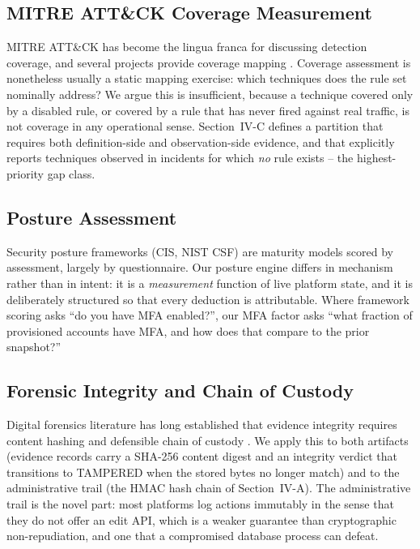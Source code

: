 \documentclass[conference]{IEEEtran}
\begin{document}
\subsection{MITRE ATT\&CK Coverage Measurement}

MITRE ATT\&CK \cite{mitre_attack} has become the lingua franca for
discussing detection coverage, and several projects provide coverage
mapping \cite{caldera, atomic}. Coverage assessment is nonetheless usually a
static mapping exercise: which techniques does the rule set nominally
address? We argue this is insufficient, because a technique covered only by a
disabled rule, or covered by a rule that has never fired against real
traffic, is not coverage in any operational sense. Section~IV-C defines a
partition that requires both definition-side and observation-side evidence,
and that explicitly reports techniques observed in incidents for which \emph{no}
rule exists -- the highest-priority gap class.

\subsection{Posture Assessment}

Security posture frameworks (CIS, NIST CSF) are maturity models scored by
assessment, largely by questionnaire. Our posture engine differs in
mechanism rather than in intent: it is a \emph{measurement} function of live
platform state, and it is deliberately structured so that every deduction is
attributable. Where framework scoring asks ``do you have MFA enabled?'', our
MFA factor asks ``what fraction of provisioned accounts have MFA, and how does
that compare to the prior snapshot?''

\subsection{Forensic Integrity and Chain of Custody}

Digital forensics literature has long established that evidence integrity
requires content hashing and defensible chain of custody
\cite{casey2001error}. We apply this to both artifacts (evidence records
carry a SHA-256 content digest and an integrity verdict that transitions to
TAMPERED when the stored bytes no longer match) and to the administrative
trail (the HMAC hash chain of Section~IV-A). The administrative trail is the
novel part: most platforms log actions immutably in the sense that they do
not offer an edit API, which is a weaker guarantee than cryptographic
non-repudiation, and one that a compromised database process can defeat.
\end{document}
